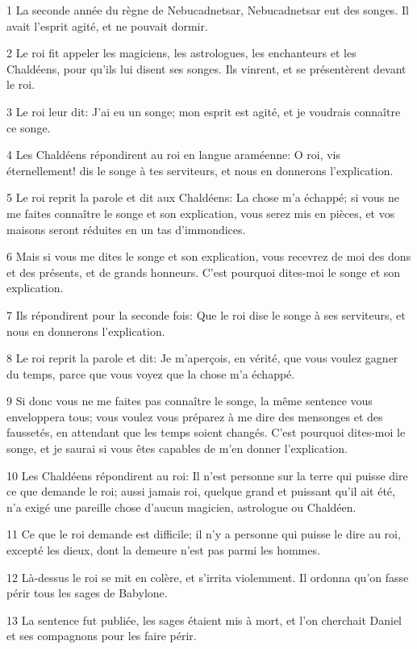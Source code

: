 \par 1 La seconde année du règne de Nebucadnetsar, Nebucadnetsar eut des songes. Il avait l'esprit agité, et ne pouvait dormir.
\par 2 Le roi fit appeler les magiciens, les astrologues, les enchanteurs et les Chaldéens, pour qu'ils lui disent ses songes. Ils vinrent, et se présentèrent devant le roi.
\par 3 Le roi leur dit: J'ai eu un songe; mon esprit est agité, et je voudrais connaître ce songe.
\par 4 Les Chaldéens répondirent au roi en langue araméenne: O roi, vis éternellement! dis le songe à tes serviteurs, et nous en donnerons l'explication.
\par 5 Le roi reprit la parole et dit aux Chaldéens: La chose m'a échappé; si vous ne me faites connaître le songe et son explication, vous serez mis en pièces, et vos maisons seront réduites en un tas d'immondices.
\par 6 Mais si vous me dites le songe et son explication, vous recevrez de moi des dons et des présents, et de grands honneurs. C'est pourquoi dites-moi le songe et son explication.
\par 7 Ils répondirent pour la seconde fois: Que le roi dise le songe à ses serviteurs, et nous en donnerons l'explication.
\par 8 Le roi reprit la parole et dit: Je m'aperçois, en vérité, que vous voulez gagner du temps, parce que vous voyez que la chose m'a échappé.
\par 9 Si donc vous ne me faites pas connaître le songe, la même sentence vous enveloppera tous; vous voulez vous préparez à me dire des mensonges et des faussetés, en attendant que les temps soient changés. C'est pourquoi dites-moi le songe, et je saurai si vous êtes capables de m'en donner l'explication.
\par 10 Les Chaldéens répondirent au roi: Il n'est personne sur la terre qui puisse dire ce que demande le roi; aussi jamais roi, quelque grand et puissant qu'il ait été, n'a exigé une pareille chose d'aucun magicien, astrologue ou Chaldéen.
\par 11 Ce que le roi demande est difficile; il n'y a personne qui puisse le dire au roi, excepté les dieux, dont la demeure n'est pas parmi les hommes.
\par 12 Là-dessus le roi se mit en colère, et s'irrita violemment. Il ordonna qu'on fasse périr tous les sages de Babylone.
\par 13 La sentence fut publiée, les sages étaient mis à mort, et l'on cherchait Daniel et ses compagnons pour les faire périr.

